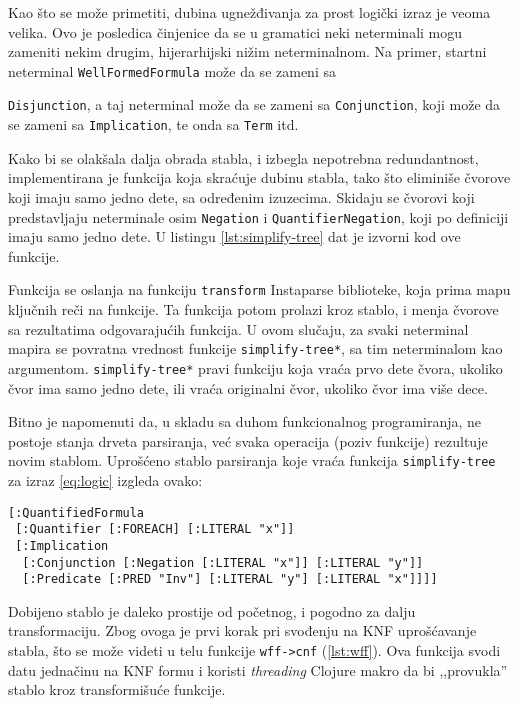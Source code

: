 Kao što se može primetiti, dubina ugnežđivanja za prost logički izraz je veoma velika. Ovo je posledica činjenice da se u gramatici neki neterminali mogu zameniti nekim drugim, hijerarhijski nižim neterminalnom. Na primer, startni neterminal \texttt{WellFormedFormula} može da se zameni sa {\texttt{Disjunction}, a taj neterminal može da se zameni sa \texttt{Conjunction}, koji može da se zameni sa \texttt{Implication}, te onda sa \texttt{Term} itd.

Kako bi se olakšala dalja obrada stabla, i izbegla nepotrebna redundantnost, implementirana je funkcija koja skraćuje dubinu stabla, tako što eliminiše čvorove koji imaju samo jedno dete, sa određenim izuzecima. Skidaju se čvorovi koji predstavljaju neterminale osim \texttt{Negation} i \texttt{QuantifierNegation}, koji po definiciji imaju samo jedno dete. U listingu \ref{lst:simplify-tree} dat je izvorni kod ove funkcije.


Funkcija se oslanja na funkciju \texttt{transform} Instaparse biblioteke, koja prima mapu ključnih reči na funkcije. Ta funkcija potom prolazi kroz stablo, i menja čvorove sa rezultatima odgovarajućih funkcija. U ovom slučaju, za svaki neterminal mapira se povratna vrednost funkcije \texttt{simplify-tree*}, sa tim neterminalom kao argumentom. \texttt{simplify-tree*} pravi funkciju koja vraća prvo dete čvora, ukoliko čvor ima samo jedno dete, ili vraća originalni čvor, ukoliko čvor ima više dece.

Bitno je napomenuti da, u skladu sa duhom funkcionalnog programiranja, ne postoje stanja drveta parsiranja, već svaka operacija (poziv funkcije) rezultuje novim stablom. Uprošćeno stablo parsiranja koje vraća funkcija \texttt{simplify-tree} za izraz \ref{eq:logic} izgleda ovako:
\begin{verbatim}
[:QuantifiedFormula
 [:Quantifier [:FOREACH] [:LITERAL "x"]]
 [:Implication
  [:Conjunction [:Negation [:LITERAL "x"]] [:LITERAL "y"]]
  [:Predicate [:PRED "Inv"] [:LITERAL "y"] [:LITERAL "x"]]]]
\end{verbatim}

Dobijeno stablo je daleko prostije od početnog, i pogodno za dalju transformaciju. Zbog ovoga je prvi korak pri svođenju na KNF uprošćavanje stabla, što se može videti u telu funkcije \texttt{wff->cnf} (\ref{lst:wff}). Ova funkcija svodi datu jednačinu na KNF formu i koristi \textit{threading} Clojure makro da bi ,,provukla'' stablo kroz transformišuće funkcije.


}
